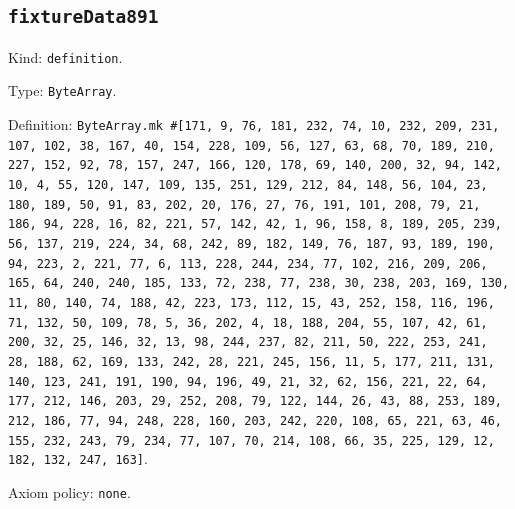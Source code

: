 \documentclass[11pt]{article}
\begin{document}
\subsection*{\texttt{fixtureData891}}
\noindent Kind: \texttt{definition}.\par
\noindent Type: \texttt{ByteArray}.\par
\noindent Definition: \texttt{ByteArray.mk \#[171, 9, 76, 181, 232, 74, 10, 232, 209, 231, 107, 102, 38, 167, 40, 154, 228, 109, 56, 127, 63, 68, 70, 189, 210, 227, 152, 92, 78, 157, 247, 166, 120, 178, 69, 140, 200, 32, 94, 142, 10, 4, 55, 120, 147, 109, 135, 251, 129, 212, 84, 148, 56, 104, 23, 180, 189, 50, 91, 83, 202, 20, 176, 27, 76, 191, 101, 208, 79, 21, 186, 94, 228, 16, 82, 221, 57, 142, 42, 1, 96, 158, 8, 189, 205, 239, 56, 137, 219, 224, 34, 68, 242, 89, 182, 149, 76, 187, 93, 189, 190, 94, 223, 2, 221, 77, 6, 113, 228, 244, 234, 77, 102, 216, 209, 206, 165, 64, 240, 240, 185, 133, 72, 238, 77, 238, 30, 238, 203, 169, 130, 11, 80, 140, 74, 188, 42, 223, 173, 112, 15, 43, 252, 158, 116, 196, 71, 132, 50, 109, 78, 5, 36, 202, 4, 18, 188, 204, 55, 107, 42, 61, 200, 32, 25, 146, 32, 13, 98, 244, 237, 82, 211, 50, 222, 253, 241, 28, 188, 62, 169, 133, 242, 28, 221, 245, 156, 11, 5, 177, 211, 131, 140, 123, 241, 191, 190, 94, 196, 49, 21, 32, 62, 156, 221, 22, 64, 177, 212, 146, 203, 29, 252, 208, 79, 122, 144, 26, 43, 88, 253, 189, 212, 186, 77, 94, 248, 228, 160, 203, 242, 220, 108, 65, 221, 63, 46, 155, 232, 243, 79, 234, 77, 107, 70, 214, 108, 66, 35, 225, 129, 12, 182, 132, 247, 163]}.\par
\noindent Axiom policy: \texttt{none}.\par
\end{document}
